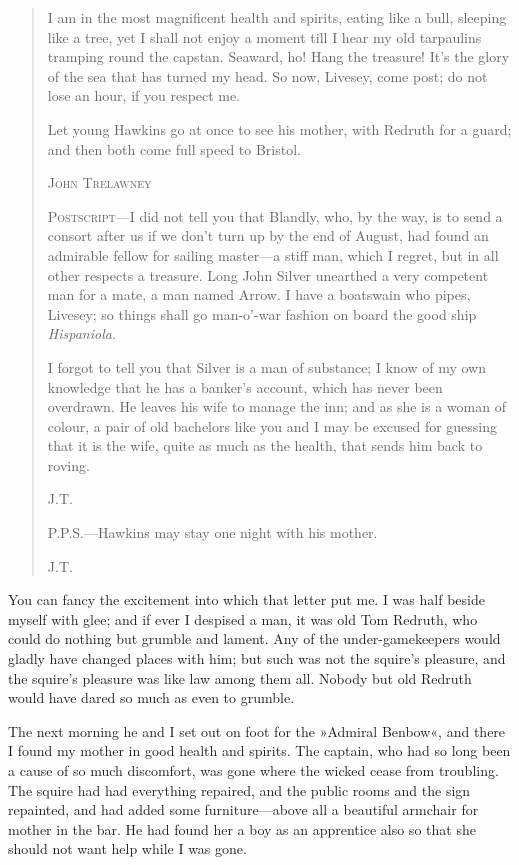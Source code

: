 \begin{quotation}
I am in the most magnificent health and spirits, eating like a bull, sleeping like a tree, yet I shall not enjoy a moment till I hear my old tarpaulins tramping round the capstan. Seaward, ho! Hang the treasure! It's the glory of the sea that has turned my head. So now, Livesey, come post; do not lose an hour, if you respect me.

Let young Hawkins go at once to see his mother, with Redruth for a guard; and then both come full speed to Bristol.
\begin{flushright}
\textsc{John Trelawney}
\end{flushright}


\textsc{Postscript}—I did not tell you that Blandly, who, by the way, is to send a consort after us if we don't turn up by the end of August, had found an admirable fellow for sailing master—a stiff man, which I regret, but in all other respects a treasure. Long John Silver unearthed a very competent man for a mate, a man named Arrow. I have a boatswain who pipes, Livesey; so things shall go man-o'-war fashion on board the good ship \textit{Hispaniola}.

I forgot to tell you that Silver is a man of substance; I know of my own knowledge that he has a banker's account, which has never been overdrawn. He leaves his wife to manage the inn; and as she is a woman of colour, a pair of old bachelors like you and I may be excused for guessing that it is the wife, quite as much as the health, that sends him back to roving.
\begin{flushright}
\textsc{J.T.}
\end{flushright}

\textsc{P.P.S.}—Hawkins may stay one night with his mother.\\
\begin{flushright}
\textsc{J.T.}
\end{flushright}

\end{quotation}

You can fancy the excitement into which that letter put me. I was half beside myself with glee; and if ever I despised a man, it was old Tom Redruth, who could do nothing but grumble and lament. Any of the under-gamekeepers would gladly have changed places with him; but such was not the squire's pleasure, and the squire's pleasure was like law among them all. Nobody but old Redruth would have dared so much as even to grumble.

The next morning he and I set out on foot for the »Admiral Benbow«, and there I found my mother in good health and spirits. The captain, who had so long been a cause of so much discomfort, was gone where the wicked cease from troubling. The squire had had everything repaired, and the public rooms and the sign repainted, and had added some furniture—above all a beautiful armchair for mother in the bar. He had found her a boy as an apprentice also so that she should not want help while I was gone.


